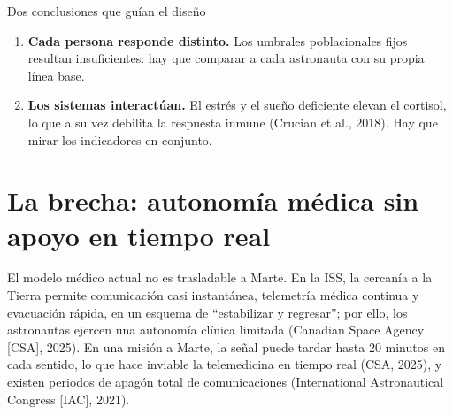 \documentclass[11pt,a4paper]{article}
\begin{document}
\begin{keybox}{Dos conclusiones que guían el diseño}
\begin{enumerate}
  \item \textbf{Cada persona responde distinto.} Los umbrales poblacionales fijos resultan insuficientes: hay que comparar a cada astronauta con su propia línea base.
  \item \textbf{Los sistemas interactúan.} El estrés y el sueño deficiente elevan el cortisol, lo que a su vez debilita la respuesta inmune (Crucian et al., 2018). Hay que mirar los indicadores en conjunto.
\end{enumerate}
\end{keybox}

\section{La brecha: autonomía médica sin apoyo en tiempo real}

El modelo médico actual no es trasladable a Marte. En la ISS, la cercanía a la Tierra permite comunicación casi instantánea, telemetría médica continua y evacuación rápida, en un esquema de \enquote{estabilizar y regresar}; por ello, los astronautas ejercen una autonomía clínica limitada (Canadian Space Agency [CSA], 2025). En una misión a Marte, la señal puede tardar hasta 20 minutos en cada sentido, lo que hace inviable la telemedicina en tiempo real (CSA, 2025), y existen periodos de apagón total de comunicaciones (International Astronautical Congress [IAC], 2021).

\begin{center}
\end{center}
\end{document}
